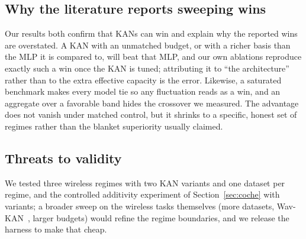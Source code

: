 \documentclass[final,5p,times]{elsarticle}
\begin{document}
\subsection{Why the literature reports sweeping wins}
Our results both confirm that KANs can win and explain why the reported wins are overstated.
A KAN with an unmatched budget, or with a richer basis than the MLP it is compared to, will
beat that MLP, and our own ablations reproduce exactly such a win once the KAN is tuned;
attributing it to ``the architecture'' rather than to the extra effective capacity is the
error. Likewise, a saturated benchmark makes every model tie so any fluctuation reads as a
win, and an aggregate over a favorable band hides the crossover we measured. The advantage
does not vanish under matched control, but it shrinks to a specific, honest set of regimes
rather than the blanket superiority usually claimed.

\subsection{Threats to validity}
We tested three wireless regimes with two KAN variants and one dataset per regime, and the
controlled additivity experiment of Section~\ref{sec:coche} with
$$ variants; a broader sweep on the wireless tasks themselves
(more datasets, Wav-KAN~\cite{wavkan}, larger budgets) would refine the regime boundaries, and
we release the harness to make that cheap.
\end{document}
